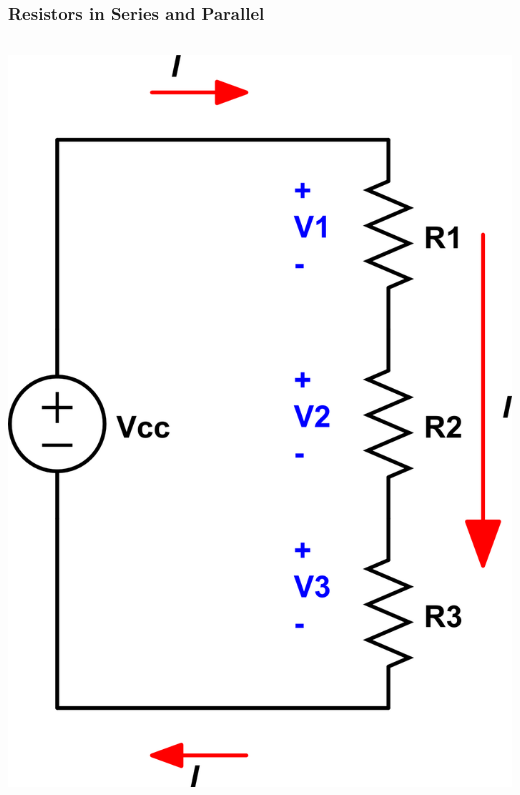 \documentclass{beamer}
\begin{document}
\begin{frame}
\frametitle{Resistors in Series and Parallel}
\begin{columns}
\begin{column}{5cm}
\begin{center}
\includegraphics[scale=0.25]{fig/series.png}

\vspace{0.5cm}


\end{center}
\end{column}
\end{columns}
\end{frame}
\end{document}
